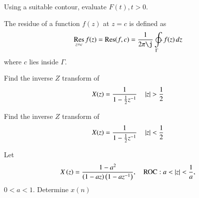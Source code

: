 \documentclass[journal,12pt,twocolumn]{IEEEtran}
\begin{document}
\begin{problem}
Using a suitable contour, evaluate $F(t), t > 0$.
\end{problem}
\begin{definition}
The residue of a function $f(z)$ at $z =c$ is defined as
\begin{equation}
\res{z=c}f(z) = \operatorname {Res} (f,c)={1 \over 2\pi \j}\ointctrclockwise\limits _{\Gamma }f(z)\,dz
\end{equation}
where $c$ lies inside $\Gamma$.
\end{definition}
\begin{problem}
Find the inverse $Z$ transform of 
\begin{equation}
X(z) = \frac{1}{1-\frac{1}{2}z^{-1}}\quad \left\vert z\right\vert > \frac{1}{2}
\end{equation}
\end{problem}
\begin{problem}
Find the inverse $Z$ transform of 
\begin{equation}
X(z) = \frac{1}{1-\frac{1}{2}z^{-1}}\quad \left\vert z\right\vert < \frac{1}{2}
\end{equation}
\end{problem}
\begin{problem}
Let 
\begin{equation}
X\left(z\right) = \frac{1-a^2}{\left(1-az\right)\left(1-az^{-1}\right)}, \quad \text{ROC}: a < \left\vert z\right\vert < \frac{1}{a}, 
\end{equation}
$0 < a< 1$.  Determine $x(n)$
\end{problem}
\end{document}
